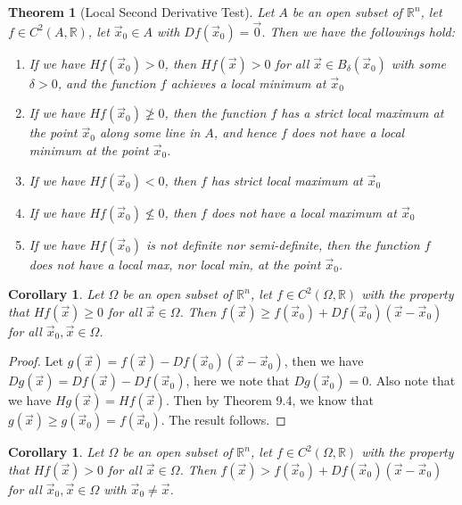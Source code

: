 \documentclass[11pt,oneside]{book}
\theoremstyle{break}
\theoremstyle{break}
\newtheorem{thm}{Theorem}[section]
\newtheorem{corT}[lem]{Corollary}
\newcommand{\R}{\mathbb{R}}
\begin{document}
\begin{thm}[Local Second Derivative Test]
Let $A$ be an open subset of $\R^n$, let $f \in C^2(A , \R)$, let $\vec{x}_0 \in A$ with $Df(\vec{x}_0) = \vec{0}$. Then we have the followings hold:
\begin{enumerate}[topsep=3pt,itemsep=-1ex,partopsep=1ex,parsep=1ex]
\item If we have $Hf(\vec{x}_0) > 0$, then $Hf(\vec{x})>0$ for all $\vec{x}\in B_\delta(\vec{x}_0)$ with some $\delta>0$, and the function $f$ achieves a local minimum at $\vec{x}_0$
\item If we have $Hf(\vec{x}_0) \ngeq 0$, then the function $f$ has a strict local maximum at the point $\vec{x}_0$ along some line in $A$, and hence $f$ does not have a local minimum at the point $\vec{x}_0$.
\item If we have  $Hf(\vec{x}_0) < 0$, then $f$ has strict local maximum at $\vec{x}_0$
\item If we have $Hf(\vec{x}_0) \nleq 0$, then $f$ does not have a local maximum at $\vec{x}_0$
\item If we have $Hf(\vec{x}_0)$ is not definite nor semi-definite, then the function $f$ does not have a local max, nor local min, at the point $\vec{x}_0$.
\end{enumerate}
\end{thm}

\begin{corT}
Let $\Omega$ be an open subset of $\R^n$, let $f \in C^2(\Omega, \R)$ with the property that $Hf(\vec{x})\geq 0$ for all $\vec{x}\in \Omega$. Then $f(\vec{x}) \geq f(\vec{x}_0) + Df(\vec{x}_0)(\vec{x}-\vec{x}_0)$ for all $\vec{x}_0,\vec{x}\in \Omega$.
\end{corT}
\begin{proof}
Let $g(\vec{x}) = f(\vec{x}) - Df(\vec{x}_0)(\vec{x}-\vec{x}_0)$, then we have $Dg(\vec{x}) =  Df(\vec{x}) - Df(\vec{x}_0)$, here we note that $Dg(\vec{x}_0) = 0$. Also note that we have $Hg(\vec{x}) = Hf(\vec{x})$. Then by Theorem 9.4, we know that $g(\vec{x}) \geq g(\vec{x}_0) = f(\vec{x}_0)$. The result follows.
\end{proof}

\begin{corT}
Let $\Omega$ be an open subset of $\R^n$, let $f \in C^2(\Omega, \R)$ with the property that $Hf(\vec{x})> 0$ for all $\vec{x}\in \Omega$. Then $f(\vec{x}) > f(\vec{x}_0) + Df(\vec{x}_0)(\vec{x}-\vec{x}_0)$ for all $\vec{x}_0,\vec{x}\in \Omega$ with $\vec{x}_0 \neq \vec{x}$.
\end{corT}
\end{document}
